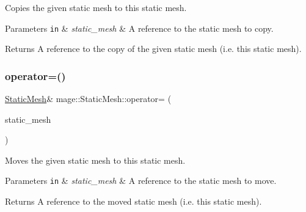 Copies the given static mesh to this static mesh.


\begin{DoxyParams}[1]{Parameters}
\mbox{\tt in}  & {\em static\+\_\+mesh} & A reference to the static mesh to copy. \\
\hline
\end{DoxyParams}
\begin{DoxyReturn}{Returns}
A reference to the copy of the given static mesh (i.\+e. this static mesh). 
\end{DoxyReturn}
\hypertarget{classmage_1_1_static_mesh_a38912f8555053abba649bea160d56e46}{}\label{classmage_1_1_static_mesh_a38912f8555053abba649bea160d56e46} 
\subsubsection{\texorpdfstring{operator=()}{operator=()}\hspace{0.1cm}{\footnotesize\ttfamily [2/2]}}
{\footnotesize\ttfamily \hyperlink{classmage_1_1_static_mesh}{Static\+Mesh}\& mage\+::\+Static\+Mesh\+::operator= (\begin{DoxyParamCaption}\item[{\hyperlink{classmage_1_1_static_mesh}{Static\+Mesh} \&\&}]{static\+\_\+mesh }\end{DoxyParamCaption})\hspace{0.3cm}{\ttfamily [delete]}}

Moves the given static mesh to this static mesh.


\begin{DoxyParams}[1]{Parameters}
\mbox{\tt in}  & {\em static\+\_\+mesh} & A reference to the static mesh to move. \\
\hline
\end{DoxyParams}
\begin{DoxyReturn}{Returns}
A reference to the moved static mesh (i.\+e. this static mesh). 
\end{DoxyReturn}
\hypertarget{classmage_1_1_static_mesh_ad9dbf64b48543424f008e664b7467360}{}\label{classmage_1_1_static_mesh_ad9dbf64b48543424f008e664b7467360} 
